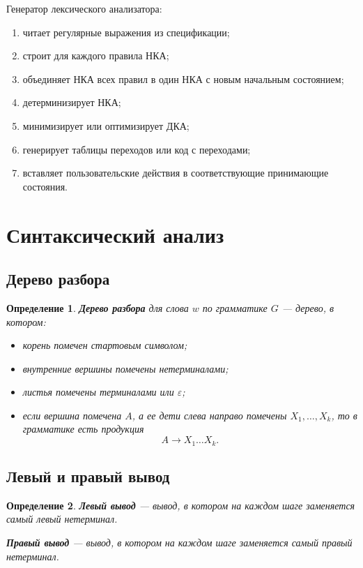\documentclass[12pt,a4paper]{article}
\newtheorem{definition}{Определение}
\begin{document}
Генератор лексического анализатора:
\begin{enumerate}
    \item читает регулярные выражения из спецификации;
    \item строит для каждого правила НКА;
    \item объединяет НКА всех правил в один НКА с новым начальным состоянием;
    \item детерминизирует НКА;
    \item минимизирует или оптимизирует ДКА;
    \item генерирует таблицы переходов или код с переходами;
    \item вставляет пользовательские действия в соответствующие принимающие состояния.
\end{enumerate}

\section{Синтаксический анализ}

\subsection{Дерево разбора}

\begin{definition}
\textbf{Дерево разбора} для слова $w$ по грамматике $G$ --- дерево, в котором:
\begin{itemize}
    \item корень помечен стартовым символом;
    \item внутренние вершины помечены нетерминалами;
    \item листья помечены терминалами или $\varepsilon$;
    \item если вершина помечена $A$, а ее дети слева направо помечены $X_1,\ldots,X_k$, то в грамматике есть продукция
    \[
    A \to X_1\ldots X_k.
    \]
\end{itemize}
\end{definition}

\subsection{Левый и правый вывод}

\begin{definition}
\textbf{Левый вывод} --- вывод, в котором на каждом шаге заменяется самый левый нетерминал.

\textbf{Правый вывод} --- вывод, в котором на каждом шаге заменяется самый правый нетерминал.
\end{definition}
\end{document}
